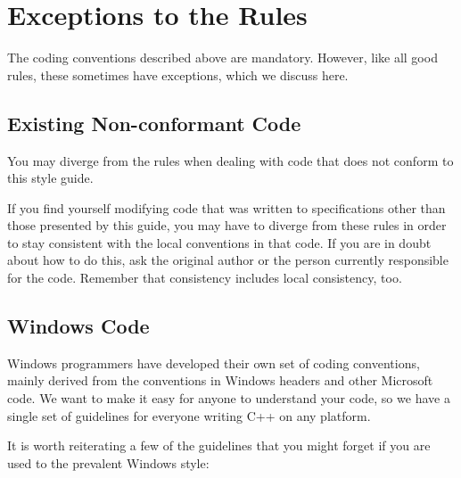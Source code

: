 \section*{Exceptions to the Rules}

The coding conventions described above are mandatory. However, like all good rules, these sometimes have exceptions, which we discuss here.

\subsection*{Existing Non-\/conformant Code}

You may diverge from the rules when dealing with code that does not conform to this style guide.

If you find yourself modifying code that was written to specifications other than those presented by this guide, you may have to diverge from these rules in order to stay consistent with the local conventions in that code. If you are in doubt about how to do this, ask the original author or the person currently responsible for the code. Remember that consistency includes local consistency, too.

\subsection*{Windows Code}

Windows programmers have developed their own set of coding conventions, mainly derived from the conventions in Windows headers and other Microsoft code. We want to make it easy for anyone to understand your code, so we have a single set of guidelines for everyone writing C++ on any platform.

It is worth reiterating a few of the guidelines that you might forget if you are used to the prevalent Windows style\+:


